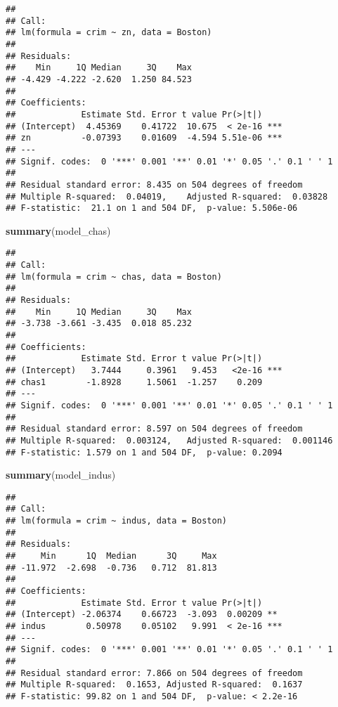\documentclass[
]{article}
\newenvironment{Shaded}{\begin{snugshade}}{\end{snugshade}}
\newcommand{\FunctionTok}[1]{\textcolor[rgb]{0.13,0.29,0.53}{\textbf{#1}}}
\newcommand{\NormalTok}[1]{#1}
\begin{document}
\begin{verbatim}
## 
## Call:
## lm(formula = crim ~ zn, data = Boston)
## 
## Residuals:
##    Min     1Q Median     3Q    Max 
## -4.429 -4.222 -2.620  1.250 84.523 
## 
## Coefficients:
##             Estimate Std. Error t value Pr(>|t|)    
## (Intercept)  4.45369    0.41722  10.675  < 2e-16 ***
## zn          -0.07393    0.01609  -4.594 5.51e-06 ***
## ---
## Signif. codes:  0 '***' 0.001 '**' 0.01 '*' 0.05 '.' 0.1 ' ' 1
## 
## Residual standard error: 8.435 on 504 degrees of freedom
## Multiple R-squared:  0.04019,    Adjusted R-squared:  0.03828 
## F-statistic:  21.1 on 1 and 504 DF,  p-value: 5.506e-06
\end{verbatim}

\begin{Shaded}
\begin{Highlighting}[]
\FunctionTok{summary}\NormalTok{(model\_chas)}
\end{Highlighting}
\end{Shaded}

\begin{verbatim}
## 
## Call:
## lm(formula = crim ~ chas, data = Boston)
## 
## Residuals:
##    Min     1Q Median     3Q    Max 
## -3.738 -3.661 -3.435  0.018 85.232 
## 
## Coefficients:
##             Estimate Std. Error t value Pr(>|t|)    
## (Intercept)   3.7444     0.3961   9.453   <2e-16 ***
## chas1        -1.8928     1.5061  -1.257    0.209    
## ---
## Signif. codes:  0 '***' 0.001 '**' 0.01 '*' 0.05 '.' 0.1 ' ' 1
## 
## Residual standard error: 8.597 on 504 degrees of freedom
## Multiple R-squared:  0.003124,   Adjusted R-squared:  0.001146 
## F-statistic: 1.579 on 1 and 504 DF,  p-value: 0.2094
\end{verbatim}

\begin{Shaded}
\begin{Highlighting}[]
\FunctionTok{summary}\NormalTok{(model\_indus)}
\end{Highlighting}
\end{Shaded}

\begin{verbatim}
## 
## Call:
## lm(formula = crim ~ indus, data = Boston)
## 
## Residuals:
##     Min      1Q  Median      3Q     Max 
## -11.972  -2.698  -0.736   0.712  81.813 
## 
## Coefficients:
##             Estimate Std. Error t value Pr(>|t|)    
## (Intercept) -2.06374    0.66723  -3.093  0.00209 ** 
## indus        0.50978    0.05102   9.991  < 2e-16 ***
## ---
## Signif. codes:  0 '***' 0.001 '**' 0.01 '*' 0.05 '.' 0.1 ' ' 1
## 
## Residual standard error: 7.866 on 504 degrees of freedom
## Multiple R-squared:  0.1653, Adjusted R-squared:  0.1637 
## F-statistic: 99.82 on 1 and 504 DF,  p-value: < 2.2e-16
\end{verbatim}
\end{document}
